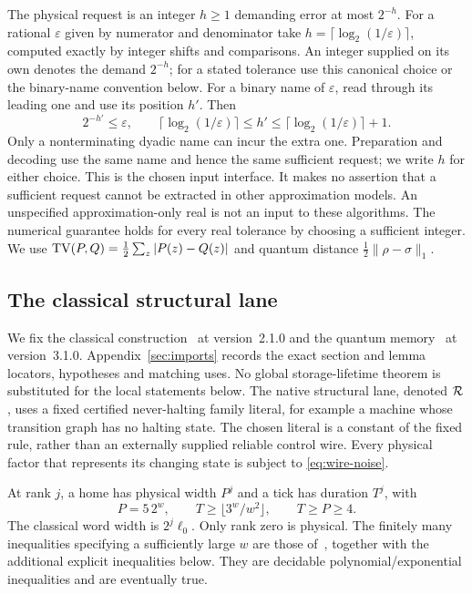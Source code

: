 The physical request is an integer $h\ge1$ demanding error at most $2^{-h}$. For a rational $\varepsilon$ given by numerator and denominator take $h=\lceil\log_2(1/\varepsilon)\rceil$, computed exactly by integer shifts and comparisons. An integer supplied on its own denotes the demand $2^{-h}$; for a stated tolerance use this canonical choice or the binary-name convention below. For a binary name of $\varepsilon$, read through its leading one and use its position $h'$. Then
\[
 2^{-h'}\le\varepsilon,\qquad
 \lceil\log_2(1/\varepsilon)\rceil\le h'
 \le\lceil\log_2(1/\varepsilon)\rceil+1.
\]
Only a nonterminating dyadic name can incur the extra one. Preparation and decoding use the same name and hence the same sufficient request; we write $h$ for either choice. This is the chosen input interface. It makes no assertion that a sufficient request cannot be extracted in other approximation models. An unspecified approximation-only real is not an input to these algorithms. The numerical guarantee holds for every real tolerance by choosing a sufficient integer. We use $\operatorname{TV}(P,Q)=\tfrac12\sum_z|P(z)-Q(z)|$ and quantum distance $\tfrac12\|\rho-\sigma\|_1$.

\subsection{The classical structural lane}\label{sec:inputs}
We fix the classical construction~\cite{DMNoise1D2026} at version~2.1.0 and the quantum memory~\cite{DMMemory2026} at version~3.1.0. Appendix~\ref{sec:imports} records the exact section and lemma locators, hypotheses and matching uses. No global storage-lifetime theorem is substituted for the local statements below. The native structural lane, denoted $\mathcal R$, uses a fixed certified never-halting family literal, for example a machine whose transition graph has no halting state. The chosen literal is a constant of the fixed rule, rather than an externally supplied reliable control wire. Every physical factor that represents its changing state is subject to \eqref{eq:wire-noise}.

At rank $j$, a home has physical width $P^j$ and a tick has duration $T^j$, with
\[
 P=5\,2^w,\qquad T\ge\lfloor3^w/w^2\rfloor,
 \qquad T\ge P\ge4.
\]
The classical word width is $2^j\ell_0$. Only rank zero is physical. The finitely many inequalities specifying a sufficiently large $w$ are those of~\cite[Section~3 and Appendix~A]{DMNoise1D2026}, together with the additional explicit inequalities below. They are decidable polynomial/exponential inequalities and are eventually true.

